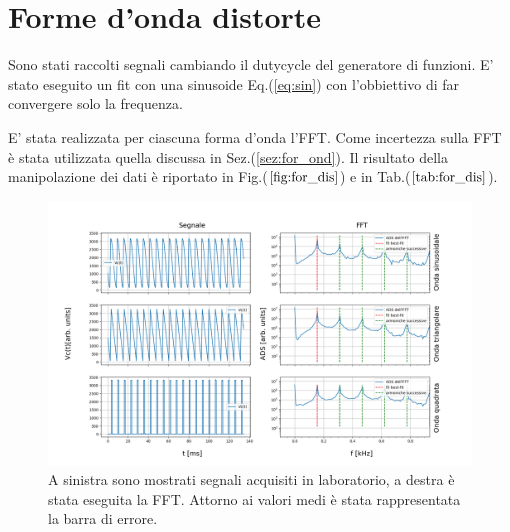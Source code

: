 \documentclass{article}
\begin{document}
\section{Forme d'onda distorte}

    Sono stati raccolti segnali cambiando il dutycycle  del generatore di funzioni.
    E' stato eseguito un fit con una sinusoide Eq.(\ref{eq:sin}) con l'obbiettivo di
    far convergere solo la frequenza.

    E' stata realizzata per ciascuna forma d'onda l'FFT.
    Come incertezza sulla FFT è stata utilizzata quella discussa in Sez.(\ref{sez:for_ond}).
    Il risultato della manipolazione dei dati è riportato in Fig.($\ref{fig:for_dis}$)
    e in Tab.($\ref{tab:for_dis}$).
        \begin{figure}[H]
                \centering
                \includegraphics[scale=0.45]{FFT5/FFTwaveforms2.png}
                \caption{A sinistra sono mostrati segnali acquisiti in laboratorio, 
                        a destra è stata eseguita la FFT.
                        Attorno ai valori medi è stata rappresentata la barra di 
                        errore.}
                \label{fig:for_dis}
        \end{figure}   
\end{document}
